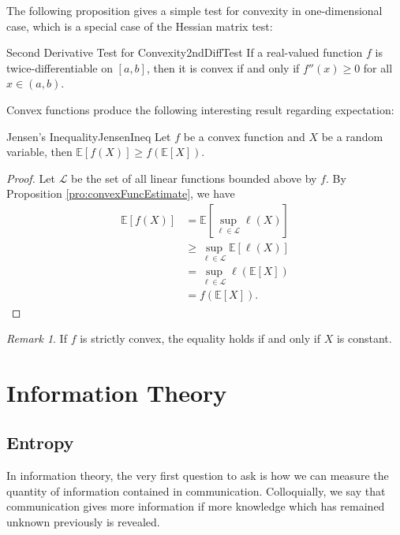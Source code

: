 \documentclass[math]{amznotes}
\theoremstyle{remark}
\newtheorem*{remark}{Remark}
\begin{document}
The following proposition gives a simple test for convexity in one-dimensional case, which is a special case of the Hessian matrix test:
\begin{probox}{Second Derivative Test for Convexity}{2ndDiffTest}
    If a real-valued function $f$ is twice-differentiable on $[a, b]$, then it is convex if and only if $f''\left(x\right) \geq 0$ for all $x \in \left(a, b\right)$.
\end{probox}
Convex functions produce the following interesting result regarding expectation:
\begin{thmbox}{Jensen's Inequality}{JensenIneq}
    Let $f$ be a convex function and $X$ be a random variable, then $\mathbb{E}[f\left(X\right)] \geq f\left(\mathbb{E}[X]\right)$.
    \tcblower
    \begin{proof}
        Let $\mathcal{L}$ be the set of all linear functions bounded above by $f$. By Proposition \ref{pro:convexFuncEstimate}, we have 
        \begin{align*}
            \mathbb{E}[f\left(X\right)] & = \mathbb{E}\left[\sup_{\ell \in \mathcal{L}}\ell\left(X\right)\right] \\
            & \geq \sup_{\ell \in \mathcal{L}}\mathbb{E}[\ell\left(X\right)] \\
            & = \sup_{\ell \in \mathcal{L}}\ell\left(\mathbb{E}[X]\right) \\
            & = f\left(\mathbb{E}[X]\right).
        \end{align*}
    \end{proof}
\end{thmbox}
\begin{notebox}
    \begin{remark}
        If $f$ is strictly convex, the equality holds if and only if $X$ is constant.
    \end{remark}
\end{notebox}
\chapter{Information Theory}
\section{Entropy}
In information theory, the very first question to ask is how we can measure the quantity of information contained in communication. Colloquially, we say that communication gives more information if more knowledge which has remained unknown previously is revealed.
\end{document}
